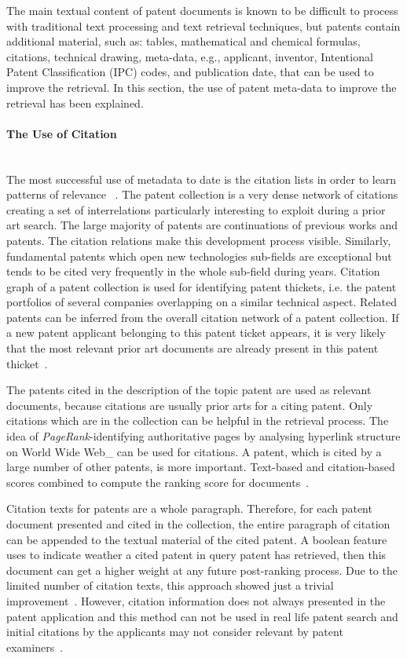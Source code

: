 The main textual content of patent documents is known to be difficult to process with traditional text processing and text retrieval techniques, but patents contain additional material, such as: tables, mathematical and chemical formulas, citations, technical drawing, meta-data, e.g., applicant, inventor, Intentional Patent Classification (IPC) codes, and publication date, that can be used to improve the retrieval. In this section, the use of patent meta-data to improve the retrieval has been explained.
\paragraph{The Use of Citation}
\ \\
The most successful use of metadata to date is the citation lists in order to learn patterns of relevance ~\citep{lupu2013patent}. The patent collection is a very dense network of citations creating a set of interrelations particularly interesting to exploit during a prior art search. The large majority of patents are continuations of previous works and patents. The citation relations make this development process
visible. Similarly, fundamental patents which open new technologies sub-fields are exceptional but tends to be cited very frequently in the whole sub-field during years. Citation graph of a patent collection is used for identifying patent thickets, i.e. the patent portfolios of several companies overlapping on a similar technical aspect. Related patents can be inferred from the overall citation network of a patent collection. If a new patent applicant belonging to this patent ticket appears, it is very likely that the most relevant prior art documents are already
present in this patent thicket~\citep{lopez2009multiple}.

The patents cited in the description of the topic patent are used as relevant documents, because citations are usually prior arts for a citing patent. Only citations which are in the collection can be helpful in the retrieval process. The idea of \textit{PageRank}-identifying authoritative pages by analysing hyperlink structure on World Wide Web\_ can be used for citations. A patent, which is cited by a large number of other patents, is more important. Text-based and citation-based scores combined to compute the ranking score for documents~\citep{fujii2007enhancing, fujii2007integrating}.

Citation texts for patents are a whole paragraph. Therefore, for each patent document presented and cited in the collection, the entire paragraph of citation can be appended to the textual material of the cited patent. A boolean feature uses to indicate weather a cited patent in query patent has retrieved, then this document can get a higher weight at any future post-ranking process. Due to the limited number of citation texts, this approach showed just a trivial improvement~\citep{lopez2009multiple}. However, citation information does not always presented in the patent application and this method can not be used in real life patent search and initial citations by the applicants may not consider relevant by patent examiners~\citep{magdy2010applying, magdy2011simple}. 

